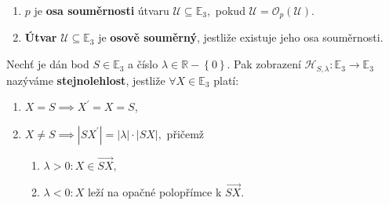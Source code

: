 \begin{definition}
\begin{enumerate}[$i.$]
\item $p$ je \textbf{osa souměrnosti} útvaru $\mathscr U\subseteq \mathbb E_3,$
pokud $\mathscr U = \mathscr O_p(\mathscr U).$
\item \textbf{Útvar} $\mathscr U \subseteq \mathbb E_3$ je \textbf{osově souměrný},
jestliže existuje jeho osa souměrnosti.
\end{enumerate}
\end{definition}

\begin{definition}
    Nechť je dán bod $S\in \mathbb E_3$ a číslo $\lambda \in \mathbb R - \left \{ 0
    \right \}. $ Pak zobrazení $\mathscr H_{S,\lambda}: \mathbb E_3 \to \mathbb E_3$
   nazýváme \textbf{stejnolehlost}, jestliže $\forall X \in \mathbb E_3$ platí:
   \begin{enumerate}[$i.$]
   \item $X=S\implies X^\prime =X=S$,
  	\item $X\ne S\implies |SX^\prime| = |\lambda|\cdot |SX|,$ přičemž
   \begin{enumerate}[$a.$]
   \item $\lambda > 0: X\in \overrightarrow{SX},$
  	\item $\lambda < 0: X$ leží na opačné polopřímce k $\overrightarrow{SX}.$
   \end{enumerate}
   \end{enumerate}
\end{definition}
